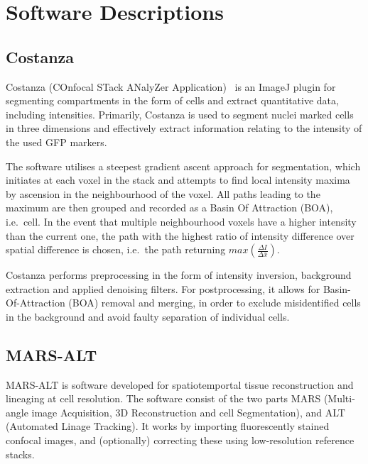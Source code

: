 
\ifpdf
\graphicspath{{Appendix3/Figs/Raster/}{Appendix3/Figs/PDF/}{Appendix3/Figs/}}
\else
\graphicspath{{Appendix3/Figs/Vector/}{Appendix3/Figs/}}
\fi
\chapter{Software Descriptions}
\label{sec:software_descr}

\section{Costanza}
Costanza (COnfocal STack ANalyZer Application)~\cite{costanza} is an ImageJ plugin for
segmenting compartments in the form of cells and extract quantitative data,
including intensities. Primarily, Costanza is used to segment nuclei marked
cells in three dimensions and effectively extract information relating to the
intensity of the used GFP markers.

The software utilises a steepest gradient ascent approach for segmentation, which
initiates at each voxel in the stack and attempts to find local intensity maxima
by ascension in the neighbourhood of the voxel. All paths leading to the maximum
are then grouped and recorded as a Basin Of Attraction (BOA), i.e.\ cell. In the event that
multiple neighbourhood voxels have a higher intensity than the current one, the
path with the highest ratio of intensity difference over spatial difference is
chosen, i.e.\ the path returning $max\left( \frac{\Delta I}{\Delta \bar x} \right)$.

Costanza performs preprocessing in the form
of intensity inversion, background extraction and applied denoising filters. 
For postprocessing, it allows for Basin-Of-Attraction (BOA) removal and merging, in
order to exclude misidentified cells in the background and avoid faulty
separation of individual cells. 


\section{MARS-ALT}
MARS-ALT is software developed for spatiotemportal tissue reconstruction and lineaging at cell
resolution. The software consist of the two parts MARS (Multi-angle image
Acquisition, 3D Reconstruction and cell Segmentation), and ALT (Automated Linage
Tracking). It works by importing fluorescently stained confocal images, and
(optionally) correcting these using low-resolution reference stacks. 

